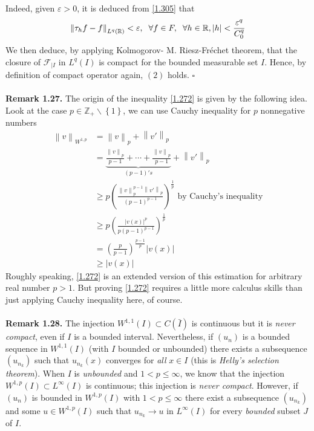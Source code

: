 \documentclass[a4paper,oneside]{article}
\numberwithin{equation}{section}
\begin{document}
Indeed, given $\varepsilon >0$, it is deduced from \eqref{1.305} that
\begin{align}
{\left\| {{\tau _h}f - f} \right\|_{{L^q}\left( \mathbb{R} \right)}} < \varepsilon ,\hspace{0.2cm}\forall f \in F,\hspace{0.2cm}\forall h \in \mathbb{R},\left| h \right| < \frac{{{\varepsilon ^q}}}{{C_0^q}}
\end{align}
We then deduce, by applying Kolmogorov- M. Riesz-Fr\'{e}chet theorem, that the closure of ${\mathcal{F}_{\left| I \right.}}$ in $L^q\left(I\right)$ is compact for the bounded measurable set $I$. Hence, by definition of compact operator again, $\left(2\right)$ holds. \hfill $\square$\\
\\
\textbf{Remark 1.27.} The origin of the inequality \eqref{1.272} is given by the following idea. Look at the case $p \in {\mathbb{Z}_ + }\backslash \left\{ 1 \right\}$, we can use Cauchy inequality for $p$ nonnegative numbers
\begin{align}
{\left\| v \right\|_{{W^{1,p}}}} &= {\left\| v \right\|_p} + {\left\| {v'} \right\|_p}\\
& = \underbrace {\frac{{{{\left\| v \right\|}_p}}}{{p - 1}} +  \cdots  + \frac{{{{\left\| v \right\|}_p}}}{{p - 1}}}_{\left( {p - 1} \right)'s} + {\left\| {v'} \right\|_p}\\
& \ge p{\left( {\frac{{\left\| v \right\|_p^{p - 1}{{\left\| {v'} \right\|}_p}}}{{{{\left( {p - 1} \right)}^{p - 1}}}}} \right)^{\frac{1}{p}}}\mbox{ by Cauchy's inequality}\\
& \ge p{\left( {\frac{{{{\left| {v\left( x \right)} \right|}^p}}}{{p{{\left( {p - 1} \right)}^{p - 1}}}}} \right)^{\frac{1}{p}}}\\
& = {\left( {\frac{p}{{p - 1}}} \right)^{\frac{{p - 1}}{p}}}\left| {v\left( x \right)} \right|\\
& \ge \left| {v\left( x \right)} \right|
\end{align}
Roughly speaking, \eqref{1.272} is an extended version of this estimation for arbitrary real number $p>1$. But proving \eqref{1.272} requires a little more calculus skills than just applying Cauchy inequality here, of course.\\
\\
\textbf{Remark 1.28.} The injection $W^{1,1}\left(I\right) \subset C\left(\bar{I}\right)$ is continuous but it is \textit{never compact}, even if $I$ is a bounded interval. Nevertheless, if $\left(u_n\right)$ is a bounded sequence in $W^{1,1}\left(I\right)$ (with $I$ bounded or unbounded) there exists a subsequence $\left(u_{n_k}\right)$ such that $u_{n_k}\left(x\right)$ converges for \textit{all} $x\in I$ (this is \textit{Helly's selection theorem}). When $I$ is \textit{unbounded} and $1<p\le \infty$, we know that the injection $W^{1,p}\left(I\right)\subset L^{\infty}\left(I\right)$ is continuous; this injection is \textit{never compact}. However, if $\left(u_n\right)$ is bounded in $W^{1,p}\left(I\right)$ with $1<p\le \infty$ there exist a subsequence $\left(u_{n_k}\right)$ and some $u\in W^{1,p}\left(I\right)$ such that $u_{n_k}\to u$ in $L^{\infty}\left(I\right)$ for every \textit{bounded} subset $J$ of $I$.\\
\end{document}
